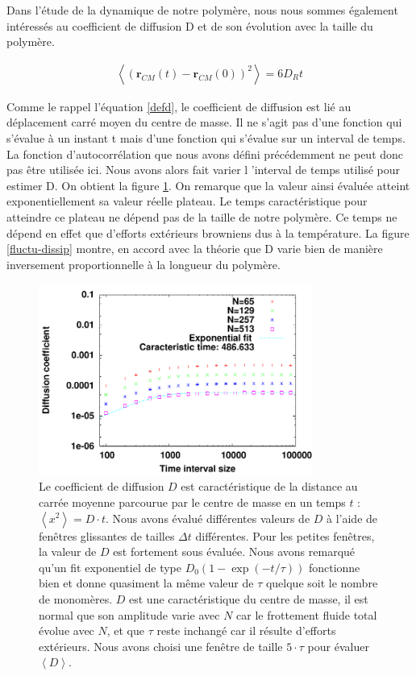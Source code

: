 \documentclass[a4paper,11pt]{article}
\begin{document}
Dans l'étude de la dynamique de notre polymère, nous nous sommes également intéressés au coefficient de diffusion D et de son évolution avec la taille du polymère.

\begin{eqnarray}
\left<(\textbf{r}_{CM}(t)-\textbf{r}_{CM}(0))^2\right>= 6 D_R t
\label{defd}
\end{eqnarray}

Comme le rappel l'équation \ref{defd}, le coefficient de diffusion est lié au déplacement carré moyen du centre de masse. Il ne s'agit pas d'une fonction qui s'évalue à un instant t mais d'une fonction qui s'évalue sur un interval de temps. La fonction d'autocorrélation que nous avons défini précédemment ne peut donc pas être utilisée ici. Nous avons alors fait varier l 'interval de temps utilisé pour estimer D. On obtient la figure \ref{dexptime}. On remarque que la valeur ainsi évaluée atteint exponentiellement sa valeur réelle plateau. Le temps caractéristique pour atteindre ce plateau ne dépend pas de la taille de notre polymère. Ce temps ne dépend en effet que d'efforts extérieurs browniens dus à la température. La figure \ref{fluctu-dissip} montre, en accord avec la théorie que D varie bien de manière inversement proportionnelle à la longueur du polymère.

\begin{figure}[H]
\begin{center}
\includegraphics[width=0.8\textwidth]{dexptime.pdf}

\caption{Le coefficient de diffusion $D$ est caractéristique de la distance au carrée moyenne parcourue par le centre de masse en un temps $t$ : $\left<x^2\right> =D\cdot t$. Nous avons évalué différentes valeurs de $D$ à l'aide de fenêtres glissantes de tailles $\Delta t$ différentes. Pour les petites fenêtres, la valeur de $D$ est fortement sous évaluée. Nous avons remarqué qu'un fit exponentiel de type $D_0\left(1-\exp\left(-t/\tau\right)\right)$ fonctionne bien et donne quasiment la même valeur de $\tau$ quelque soit le nombre de monomères. $D$ est une caractéristique du centre de masse, il est normal que son amplitude varie avec $N$ car le frottement fluide total évolue avec $N$, et que $\tau$ reste inchangé car il résulte d’efforts extérieurs. Nous avons choisi une fenêtre de taille $5\cdot \tau$ pour évaluer $\left<D\right> $.}
\label{dexptime}
\end{center}
\end{figure}
\end{document}
